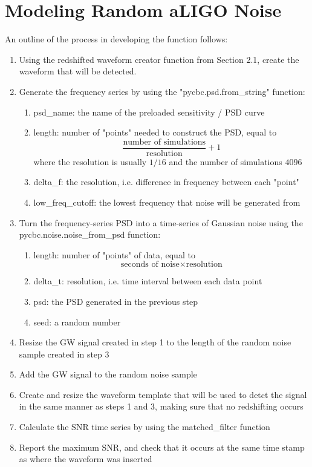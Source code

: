 \documentclass{article}
\begin{document}
\section{Modeling Random aLIGO Noise}

An outline of the process in developing the function follows: 
\begin{enumerate}
    \item Using the redshifted waveform creator function from Section 2.1, create the waveform that will be detected. 
    \item Generate the frequency series by using the "pycbc.psd.from\_string" function:
    \begin{enumerate}
        \setlength{\itemsep}{0pt}
        \item psd\_name: the name of the preloaded sensitivity / PSD curve
        \item length: number of "points" needed to construct the PSD, equal to 
        \begin{equation}
            \frac{\text{number of simulations}}{\text{resolution}} + 1
        \end{equation}
        where the resolution is usually $1/16$ and the number of simulations $4096$
        \item delta\_f: the resolution, i.e. difference in frequency between each "point"
        \item low\_freq\_cutoff: the lowest frequency that noise will be generated from
    \end{enumerate}
    \item Turn the frequency-series PSD into a time-series of Gaussian noise using the pycbc.noise.noise\_from\_psd function:
    \begin{enumerate}
        \setlength{\itemsep}{0pt}
        \item length: number of "points" of data, equal to 
        \begin{equation}
            \text{seconds of noise} \times \text{resolution}
        \end{equation}
        \item delta\_t: resolution, i.e. time interval between each data point
        \item psd: the PSD generated in the previous step
        \item seed: a random number
    \end{enumerate}
    \item Resize the GW signal created in step 1 to the length of the random noise sample created in step 3
    \item Add the GW signal to the random noise sample
    \item Create and resize the waveform template that will be used to detct the signal in the same manner as steps 1 and 3, making sure that no redshifting occurs
    \item Calculate the SNR time series by using the matched\_filter function
    \item Report the maximum SNR, and check that it occurs at the same time stamp as where the waveform was inserted
\end{enumerate}
\end{document}
